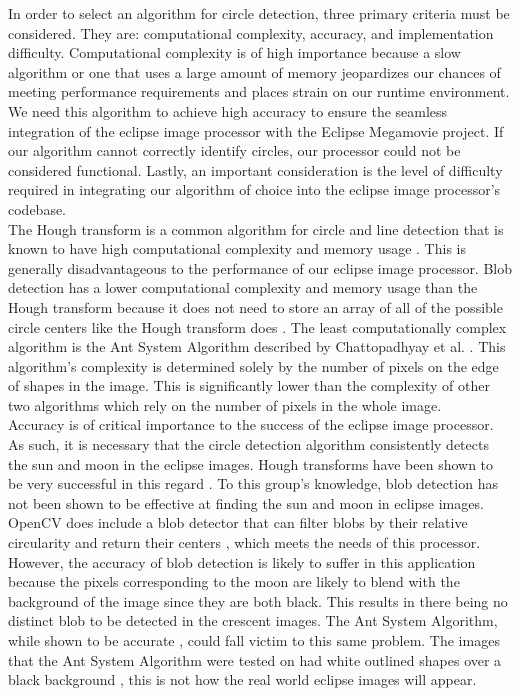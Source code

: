 \documentclass[10pt, onecolumn, draftclsnofoot, letterpaper, compsoc]{IEEEtran}
\begin{document}
In order to select an algorithm for circle detection, three primary criteria
must be considered. They are: computational complexity, accuracy, and
implementation difficulty. Computational complexity is of high importance
because a slow algorithm or one that uses a large amount of memory jeopardizes
our chances of meeting performance requirements and places strain on our runtime
environment. We need this algorithm to achieve high accuracy to ensure the
seamless integration of the eclipse image processor with the Eclipse Megamovie
project. If our algorithm cannot correctly identify circles, our processor could
not be considered functional. Lastly, an important consideration is the level of
difficulty required in integrating our algorithm of choice into the eclipse
image processor’s codebase. \\


The Hough transform is a common algorithm for circle and line detection that is
known to have high computational complexity and memory usage \cite{hough,
antsystem}. This is generally disadvantageous to the performance of our eclipse
image processor. Blob detection has a lower computational complexity and memory
usage than the Hough transform because it does not need to store an array of all
of the possible circle centers like the Hough transform does \cite{hough,
blobarticle, blobref}. The least computationally complex algorithm is the Ant
System Algorithm described by Chattopadhyay et al. \cite{antsystem}. This
algorithm’s complexity is determined solely by the number of pixels on the edge
of shapes in the image. This is significantly lower than the complexity of other
two algorithms which rely on the number of pixels in the whole image. \\


Accuracy is of critical importance to the success of the eclipse image
processor. As such, it is necessary that the circle detection algorithm
consistently detects the sun and moon in the eclipse images. Hough transforms
have been shown to be very successful in this regard \cite{imgKrista}. To this
group’s knowledge, blob detection has not been shown to be effective at finding
the sun and moon in eclipse images. OpenCV does include a blob detector that can
filter blobs by their relative circularity and return their centers
\cite{blobarticle, blobref}, which meets the needs of this processor. However,
the accuracy of blob detection is likely to suffer in this application because
the pixels corresponding to the moon are likely to blend with the background of
the image since they are both black. This results in there being no distinct
blob to be detected in the crescent images. The Ant System Algorithm, while
shown to be accurate \cite{antsystem}, could fall victim to this same problem.
The images that the Ant System Algorithm were tested on had white outlined
shapes over a black background \cite{antsystem}, this is not how the real world
eclipse images will appear. \\
\end{document}
